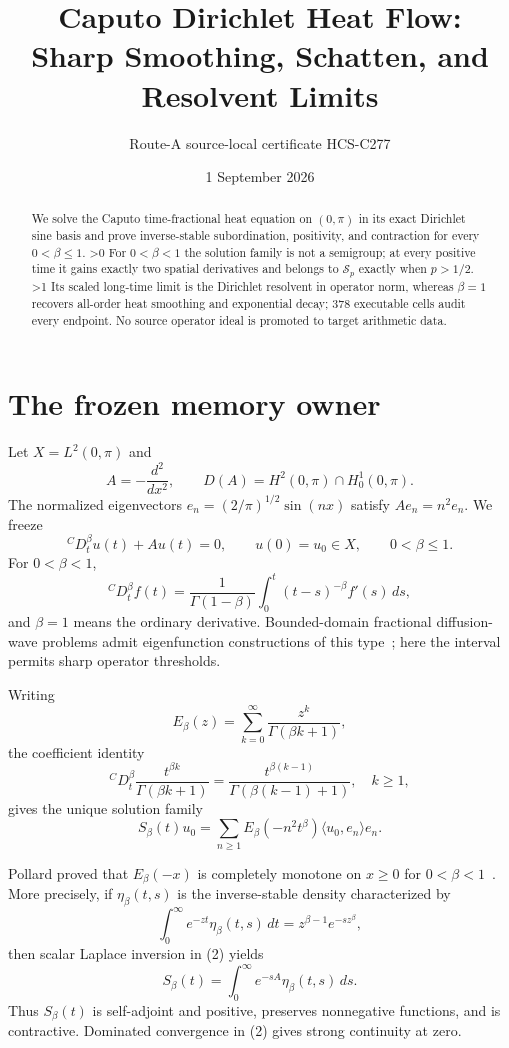 \documentclass[10pt]{article}
\title{Caputo Dirichlet Heat Flow:\\Sharp Smoothing, Schatten, and Resolvent Limits}
\author{Route-A source-local certificate HCS-C277}
\date{1 September 2026}
\providecommand{\CRevisionRound}{2}
\begin{document}
\maketitle
\begin{abstract}
We solve the Caputo time-fractional heat equation on $(0,\pi)$ in its exact
Dirichlet sine basis and prove inverse-stable subordination, positivity, and
contraction for every $0<\beta\leq1$.
\ifnum\CRevisionRound>0 For $0<\beta<1$ the solution family is not a semigroup;
at every positive time it gains exactly two spatial derivatives and belongs
to $\mathcal S_p$ exactly when $p>1/2$.
\fi\space
\ifnum\CRevisionRound>1 Its scaled long-time limit is the Dirichlet resolvent
in operator norm, whereas $\beta=1$ recovers all-order heat smoothing and
exponential decay; 378 executable cells audit every endpoint.
\fi\space
No source operator ideal is promoted to target arithmetic data.
\end{abstract}

\section{The frozen memory owner}
Let $X=L^2(0,\pi)$ and
\[
 A=-\frac{d^2}{dx^2},\qquad
 D(A)=H^2(0,\pi)\cap H_0^1(0,\pi).
\]
The normalized eigenvectors $e_n=(2/\pi)^{1/2}\sin(nx)$ satisfy
$Ae_n=n^2e_n$.  We freeze
\begin{equation}
 {}^C D_t^\beta u(t)+Au(t)=0,\qquad u(0)=u_0\in X,
 \qquad 0<\beta\leq1.                                      \tag{1}
\end{equation}
For $0<\beta<1$,
\[
 {}^C D_t^\beta f(t)=\frac1{\Gamma(1-\beta)}
 \int_0^t(t-s)^{-\beta}f'(s)\,ds,
\]
and $\beta=1$ means the ordinary derivative.  Bounded-domain fractional
diffusion-wave problems admit eigenfunction constructions of this
type~\cite{SY}; here the interval permits sharp operator thresholds.

Writing
\[
 E_\beta(z)=\sum_{k=0}^\infty\frac{z^k}{\Gamma(\beta k+1)},
\]
the coefficient identity
\[
 {}^C D_t^\beta\frac{t^{\beta k}}{\Gamma(\beta k+1)}
 =\frac{t^{\beta(k-1)}}{\Gamma(\beta(k-1)+1)},\quad k\geq1,
\]
gives the unique solution family
\begin{equation}
 S_\beta(t)u_0=\sum_{n\geq1}
 E_\beta(-n^2t^\beta)\langle u_0,e_n\rangle e_n.          \tag{2}
\end{equation}

Pollard proved that $E_\beta(-x)$ is completely monotone on $x\geq0$ for
$0<\beta<1$~\cite{Pollard}.  More precisely, if $\eta_\beta(t,s)$ is the
inverse-stable density characterized by
\[
 \int_0^\infty e^{-zt}\eta_\beta(t,s)\,dt
 =z^{\beta-1}e^{-sz^\beta},
\]
then scalar Laplace inversion in (2) yields
\begin{equation}
 S_\beta(t)=\int_0^\infty e^{-sA}\eta_\beta(t,s)\,ds.     \tag{3}
\end{equation}
Thus $S_\beta(t)$ is self-adjoint and positive, preserves nonnegative
functions, and is contractive.  Dominated convergence in (2) gives strong
continuity at zero.
\end{document}
